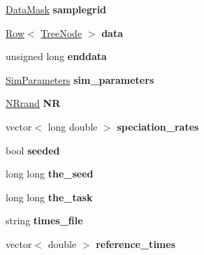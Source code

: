 \begin{DoxyCompactItemize}
\item 
\hyperlink{class_data_mask}{Data\+Mask} {\bfseries samplegrid}\hypertarget{class_spatial_tree_ad902e850c9573b5c26ef6d77a203f72d}{}\label{class_spatial_tree_ad902e850c9573b5c26ef6d77a203f72d}

\item 
\hyperlink{class_row}{Row}$<$ \hyperlink{class_tree_node}{Tree\+Node} $>$ {\bfseries data}\hypertarget{class_tree_a5983af6c56e41be51be0766941093b4b}{}\label{class_tree_a5983af6c56e41be51be0766941093b4b}

\item 
unsigned long {\bfseries enddata}\hypertarget{class_tree_a50344999e6b64d15eef935b1f6023471}{}\label{class_tree_a50344999e6b64d15eef935b1f6023471}

\item 
\hyperlink{struct_sim_parameters}{Sim\+Parameters} {\bfseries sim\+\_\+parameters}\hypertarget{class_tree_a63c399793a209332ad0f5da7fc830d56}{}\label{class_tree_a63c399793a209332ad0f5da7fc830d56}

\item 
\hyperlink{class_n_rrand}{N\+Rrand} {\bfseries NR}\hypertarget{class_tree_aa7df162306777b040a9a2aac543e6801}{}\label{class_tree_aa7df162306777b040a9a2aac543e6801}

\item 
vector$<$ long double $>$ {\bfseries speciation\+\_\+rates}\hypertarget{class_tree_a61b4349fe78d09ac06eff4b7d6833105}{}\label{class_tree_a61b4349fe78d09ac06eff4b7d6833105}

\item 
bool {\bfseries seeded}\hypertarget{class_tree_a78935befd45946b8e69023bffca59c1d}{}\label{class_tree_a78935befd45946b8e69023bffca59c1d}

\item 
long long {\bfseries the\+\_\+seed}\hypertarget{class_tree_acf483ed0a44629c9aa4690a08017ee35}{}\label{class_tree_acf483ed0a44629c9aa4690a08017ee35}

\item 
long long {\bfseries the\+\_\+task}\hypertarget{class_tree_a9f74137d5c9c5529ec9a06f88dfa6960}{}\label{class_tree_a9f74137d5c9c5529ec9a06f88dfa6960}

\item 
string {\bfseries times\+\_\+file}\hypertarget{class_tree_a5e031ea8d94f48288547116a9e7d7add}{}\label{class_tree_a5e031ea8d94f48288547116a9e7d7add}

\item 
vector$<$ double $>$ {\bfseries reference\+\_\+times}\hypertarget{class_tree_a56bb1ea64368f5b705360a435350f9d5}{}\label{class_tree_a56bb1ea64368f5b705360a435350f9d5}


\end{DoxyCompactItemize}
